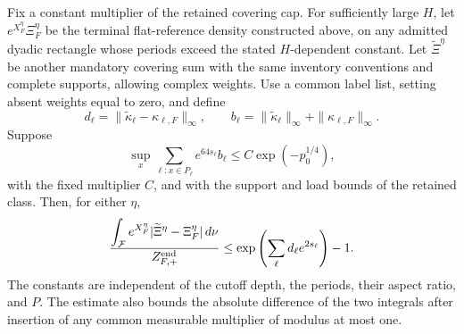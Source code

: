 \begin{proposition}
\label{prop:comparison-flat-integrated}
Fix a constant multiplier of the retained covering cap.  For sufficiently
large \(H\), let \(e^{X_F^\eta}\Xi_F^\eta\) be the terminal flat-reference
density constructed above, on any admitted dyadic rectangle whose
periods exceed the stated \(H\)-dependent constant.  Let
\(\widetilde\Xi^\eta\) be another mandatory covering sum with the same
inventory conventions and complete supports, allowing complex weights.
Use a common label list, setting absent weights equal to zero, and define
\[
 d_\ell=\|\widetilde\kappa_\ell-\kappa_{\ell,F}\|_\infty,
 \qquad
 b_\ell=\|\widetilde\kappa_\ell\|_\infty+
              \|\kappa_{\ell,F}\|_\infty.
\]
Suppose
\[
 \sup_x\sum_{\ell:x\in P_\ell}e^{64s_\ell}b_\ell
 \le C\exp(-p_0^{1/4}),
\]
with the fixed multiplier \(C\), and with the support and load bounds of
the retained class.  Then, for either \(\eta\),
\begin{equation}
 \frac{\displaystyle\int_{\mathcal F}e^{X_F^\eta}
              |\widetilde\Xi^\eta-\Xi_F^\eta|\,d\nu}
      {Z_{F,+}^{\rm end}}
 \le
 \exp\left(\sum_\ell d_\ell e^{2s_\ell}\right)-1.
 \label{eq:comparison-flat-cover}
\end{equation}
The constants are independent of the cutoff depth, the periods, their
aspect ratio, and \(P\).  The estimate also bounds the absolute difference
of the two integrals after insertion of any common measurable multiplier
of modulus at most one.
\end{proposition}

